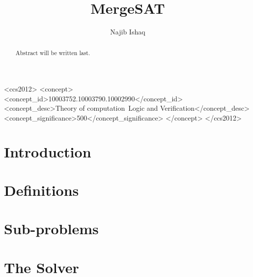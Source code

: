 \documentclass[acmsmall,authordraft]{acmart}
\begin{document}
    \title{MergeSAT}

    \author{Najib Ishaq}

    \renewcommand{\shortauthors}{Najib}

    \begin{abstract}
        Abstract will be written last.
    \end{abstract}

    \begin{CCSXML}
        <ccs2012>
            <concept>
                <concept_id>10003752.10003790.10002990</concept_id>
                <concept_desc>Theory of computation~Logic and Verification</concept_desc>
                <concept_significance>500</concept_significance>
            </concept>
        </ccs2012>
\end{CCSXML}



    \maketitle

    \section{Introduction}
    \label{sec:introduction}
    

    \section{Definitions}
    \label{sec:definitions}
    

    \section{Sub-problems}
    \label{sec:sub-problems}
    

    \section{The Solver}
    \label{sec:the-solver}
    
\end{document}
